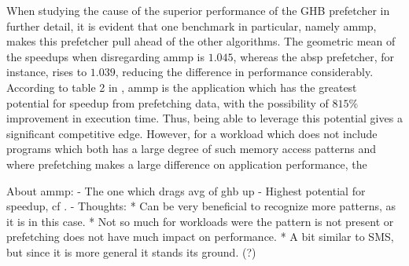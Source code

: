 

When studying the cause of the superior performance of the GHB
prefetcher in further detail, it is evident that one benchmark in
particular, namely ammp, makes this prefetcher pull ahead of the other
algorithms. The geometric mean of the speedups when disregarding ammp
is $1.045$, whereas the absp prefetcher, for instance, rises to
$1.039$, reducing the difference in performance
considerably. According to table 2 in \cite{Nesbit}, ammp is the
application which has the greatest potential for speedup from
prefetching data, with the possibility of $815\%$ improvement in
execution time. Thus, being able to leverage this potential gives a
significant competitive edge. However, for a workload which does not
include programs which both has a large degree of such memory access
patterns and where prefetching makes a large difference on application
performance, the 

About ammp:
- The one which drags avg of ghb up
- Highest potential for speedup, cf \cite{Nesbit}.
- Thoughts:
  * Can be very beneficial to recognize more patterns, as it is in this case.
  * Not so much for workloads were the pattern is not present or
    prefetching does not have much impact on performance.
  * A bit similar to SMS, but since it is more general it stands its ground. (?)



